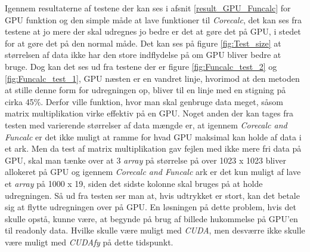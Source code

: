 Igennem resultaterne af testene der kan ses i afsnit \ref{result_GPU_Funcalc} for GPU funktion og den simple måde at lave funktioner til \textit{Corecalc}, det kan ses fra testene at jo mere der skal udregnes jo bedre er det at gøre det på GPU, i stedet for at gøre det på den normal måde. Det kan ses på figure \ref{fig:Test_size} at størrelsen af data ikke har den store indflydelse på om GPU bliver bedre at bruge. Dog kan det ses ud fra testene der er figure \ref{fig:Funcalc_test_2} og \ref{fig:Funcalc_test_1}, GPU næsten er en vandret linje, hvorimod at den metoden at stille denne form for udregningen op, bliver til en linje med en stigning på cirka 45\%. Derfor ville funktion, hvor man skal genbruge data meget, såsom matrix multiplikation virke effektiv på en GPU. Noget anden der kan tages fra testen med varierende størrelser af data mængde er, at igennem \textit{Corecalc and Funcalc} er det ikke muligt at ramme for hvad GPU maksimal kan holde af data i et ark. Men da test af matrix multiplikation gav fejlen med ikke mere fri data på GPU, skal man tænke over at 3 \textit{array} på størrelse på over 1023 x 1023 bliver allokeret på GPU og igennem \textit{Corecalc and Funcalc} ark er det kun muligt af lave et \textit{array} på 1000 x 19, siden det sidste kolonne skal bruges på at holde udregningen. Så ud fra testen ser man at, hvis udtrykket er stort, kan det betale sig at flytte udregningen over på GPU. En løsningen på dette problem, hvis det skulle opstå, kunne være, at begynde på brug af billede hukommelse på GPU'en til readonly data. Hvilke skulle være muligt med \textit{CUDA}, men desværre ikke skulle være muligt med \textit{CUDAfy} på dette tidspunkt. 